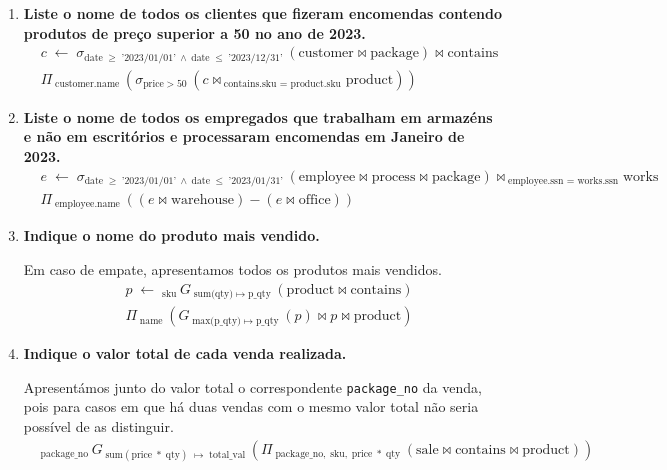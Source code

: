 \documentclass[12pt,a4paper]{article}
\newcommand{\op}{\text}
\begin{document}
  \vspace*{10pt}
  \begin{enumerate}
    \item \textbf{Liste o nome de todos os clientes que fizeram encomendas contendo produtos de preço superior a 50\textmd{\texteuro} no ano de 2023.}
    \[
      \begin{aligned}
        & c \; \leftarrow \; \sigma_{\op{date} \; \geq \; \text{'2023/01/01'} ~\land~ \op{date} \; \leq \; \text{'2023/12/31'} \;}(\op{customer} \bowtie \op{package})\bowtie \op{contains} \\
        & \Pi _{\; \op{customer.name} \;}( \sigma _{\op{price} \; > \; \op{50} \;} (c \bowtie _{\; \op{contains.sku = product.sku}}\op{product}))
      \end{aligned}
    \]

    \item \textbf{Liste o nome de todos os empregados que trabalham em armazéns e não em escritórios e processaram encomendas em Janeiro de 2023.}
    \[
      \begin{aligned}
        & e \; \leftarrow \; \sigma_{\op{date} \; \geq \; \text{'2023/01/01'} ~\land~ \op{date} \; \leq \; \text{'2023/01/31'} \;}(\op{employee} \bowtie \op{process} \bowtie \op{package}) \bowtie _{\; \op{employee.ssn = works.ssn}} \op{works} \\
        & \Pi _{\; \op{employee.name} \;}((e \bowtie \op{warehouse}) - (e \bowtie \op{office}))
      \end{aligned}
    \]

    \item \textbf{Indique o nome do produto mais vendido.}

    Em caso de empate, apresentamos todos os produtos mais vendidos.
    \[
      \begin{aligned}
        & p \; \leftarrow \; _{\op{sku} \;} G _{\; \op{sum(qty)} \; \mapsto \; \op{p\_qty} \;}(\op{product} \bowtie \op{contains}) \\
        & \Pi _{\; \op{name} \;}(G _{\; \op{max(p\_qty)} \; \mapsto \; \op{p\_qty} \;}(p) \bowtie p \bowtie \op{product})
      \end{aligned}
    \]

    \item \textbf{Indique o valor total de cada venda realizada.}

    Apresentámos junto do valor total o correspondente \texttt{package\_no} da venda, pois para casos em que
    há duas vendas com o mesmo valor total não seria possível de as distinguir.
    \[
      \begin{aligned}
          & _{\op{package\_no} \;} G _{\; \op{sum}(\op{price} \; * \; \op{qty}) \; \mapsto \; \op{total\_val} \;}(\Pi _{ \; \op{package\_no}, \; \op{sku}, \; \op{price} \; * \; \op{qty} \;}(\op{sale} \bowtie \op{contains} \bowtie \op{product}))
      \end{aligned}
    \]
  \end{enumerate}
\end{document}

